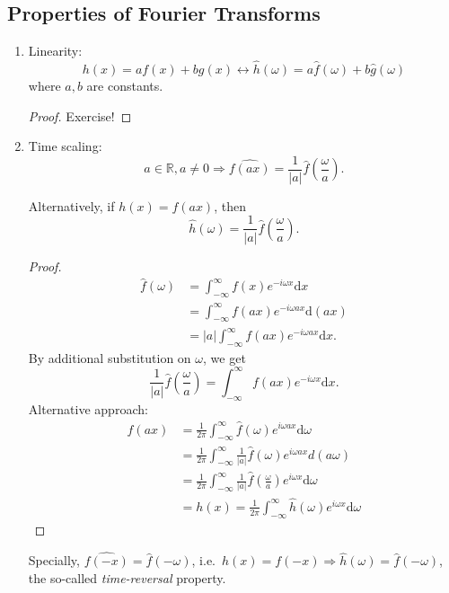 \documentclass[12pt]{report}
\theoremstyle{definition}
\begin{document}
\subsection{Properties of Fourier Transforms}

\begin{enumerate}[label = (\roman*)]
    \item Linearity:\[
            h(x) = af(x) + bg(x) \longleftrightarrow \hat{h}(\omega) = a\hat{f}(\omega) + b\hat{g}(\omega)
        \]where $a,b$ are constants.
        \begin{proof}
            Exercise!
        \end{proof} 

    \item Time scaling:
        \[
            a\in\mathbb{R}, a\neq 0 \Longrightarrow{}
            \widehat{f(ax)} = \frac{1}{|a|}\hat{f}\left(\frac{\omega}{a}\right).
        \]

        Alternatively, if $h(x)=f(ax)$, then\[
            \hat{h}(\omega) = \frac{1}{|a|}\hat{f}\left(\frac{\omega}{a}\right).
        \]
        \begin{proof}
            \[
                \begin{align*}
                    \hat{f}(\omega)
                    & = \int_{-\infty}^{\infty} f(x)e^{-i\omega x}\mathrm{d}x \\
                    & = \int_{-\infty}^{\infty} f(ax)e^{-i\omega ax}\mathrm{d}(ax) \\
                    & = |a|\int_{-\infty}^{\infty} f(ax)e^{-i\omega ax}\mathrm{d}x.
                \end{align*} 
            \]By additional substitution on $\omega$, we get\[
            \frac{1}{|a|}\hat{f}\left(\frac{\omega}{a}\right) =
            \int_{-\infty}^{\infty} f(ax) e^{-i\omega x}\mathrm{d}x.
            \]
            Alternative approach:\[
                \begin{align*}
                    f(ax)
                    & = \frac{1}{2\pi} \int_{-\infty}^{\infty} \hat{f}(\omega)e^{i\omega ax}\mathrm{d}\omega \\
                    & = \frac{1}{2\pi}\int_{-\infty}^{\infty} \frac{1}{|a|}\hat{f}(\omega)e^{i\omega ax}d(a\omega) \\
                    & = \frac{1}{2\pi}\int_{-\infty}^{\infty} \frac{1}{|a|}\hat{f}\left(\frac{\omega}{a}\right)
                    e^{i\omega x}\mathrm{d}\omega \\
                    & = h(x) = \frac{1}{2\pi}\int_{-\infty}^{\infty} \hat{h}(\omega) e^{i\omega x} \mathrm{d}\omega
                \end{align*} 
            \]
        \end{proof} 
        Specially, $\widehat{f(-x)} = \hat{f}(-\omega)$, i.e.\
        $h(x) = f(-x) \Rightarrow{} \hat{h}(\omega) = \hat{f}(-\omega)$,
        the so-called \emph{time-reversal} property.


\end{enumerate}
\end{document}
